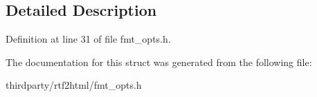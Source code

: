 \subsection{Detailed Description}


Definition at line 31 of file fmt\+\_\+opts.\+h.



The documentation for this struct was generated from the following file\+:\begin{DoxyCompactItemize}
\item 
thirdparty/rtf2html/fmt\+\_\+opts.\+h\end{DoxyCompactItemize}
